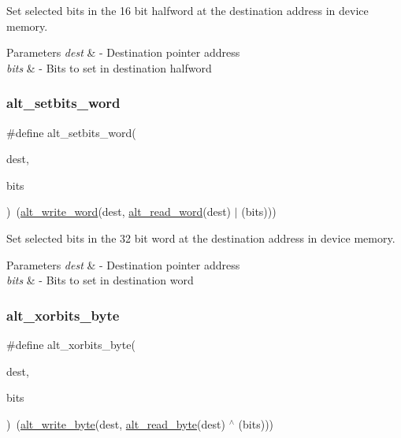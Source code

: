 Set selected bits in the 16 bit halfword at the destination address in device memory. 
\begin{DoxyParams}{Parameters}
{\em dest} & -\/ Destination pointer address \\
\hline
{\em bits} & -\/ Bits to set in destination halfword \\
\hline
\end{DoxyParams}
\mbox{\label{group__ALT__SOCAL__UTIL__SC__FUNC_gaea6f60a4ea5bb48bcbbd8fc33a69881a}} 
\subsubsection{\texorpdfstring{alt\_setbits\_word}{alt\_setbits\_word}}
{\footnotesize\ttfamily \#define alt\+\_\+setbits\+\_\+word(\begin{DoxyParamCaption}\item[{}]{dest,  }\item[{}]{bits }\end{DoxyParamCaption})~(\mbox{\hyperlink{group__ALT__SOCAL__UTIL__RW__FUNC_gac135ea12921af3aeb033c92ddb82c66c}{alt\+\_\+write\+\_\+word}}(dest, \mbox{\hyperlink{group__ALT__SOCAL__UTIL__RW__FUNC_ga77db76edef8b90adb75eb837325b5d11}{alt\+\_\+read\+\_\+word}}(dest) $\vert$ (bits)))}

Set selected bits in the 32 bit word at the destination address in device memory. 
\begin{DoxyParams}{Parameters}
{\em dest} & -\/ Destination pointer address \\
\hline
{\em bits} & -\/ Bits to set in destination word \\
\hline
\end{DoxyParams}
\mbox{\label{group__ALT__SOCAL__UTIL__SC__FUNC_gaac23b9846f8fe7a7f7ed26ad9c71c98a}} 
\subsubsection{\texorpdfstring{alt\_xorbits\_byte}{alt\_xorbits\_byte}}
{\footnotesize\ttfamily \#define alt\+\_\+xorbits\+\_\+byte(\begin{DoxyParamCaption}\item[{}]{dest,  }\item[{}]{bits }\end{DoxyParamCaption})~(\mbox{\hyperlink{group__ALT__SOCAL__UTIL__RW__FUNC_ga48f504d9c370e45073a9c5e142e1036d}{alt\+\_\+write\+\_\+byte}}(dest, \mbox{\hyperlink{group__ALT__SOCAL__UTIL__RW__FUNC_ga1bf0798969c891f5885170ff2de3ac88}{alt\+\_\+read\+\_\+byte}}(dest) $^\wedge$ (bits)))}

